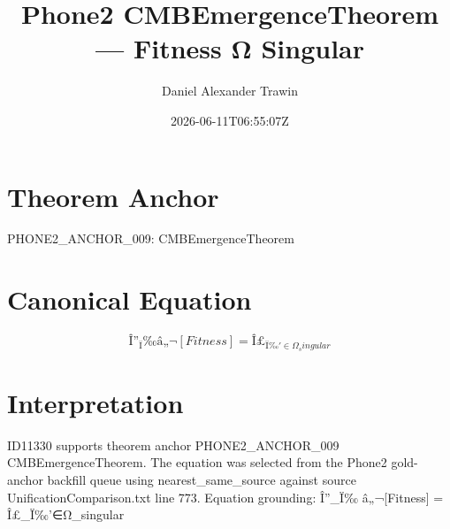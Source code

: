 \documentclass[11pt]{article}
\title{Phone2 CMBEmergenceTheorem — Fitness Ω Singular}
\author{Daniel Alexander Trawin}
\date{2026-06-11T06:55:07Z}
\begin{document}
\maketitle
\section*{Theorem Anchor}
PHONE2_ANCHOR_009: CMBEmergenceTheorem
\section*{Canonical Equation}
\[
Î”_Ï‰ â„¬[Fitness] = Î£_{Ï‰'∈Ω_singular}
\]
\section*{Interpretation}
ID11330 supports theorem anchor PHONE2_ANCHOR_009 CMBEmergenceTheorem. The equation was selected from the Phone2 gold-anchor backfill queue using nearest_same_source against source UnificationComparison.txt line 773. Equation grounding: Î”_Ï‰ â„¬[Fitness] = Î£_{Ï‰'∈Ω_singular}
\end{document}
